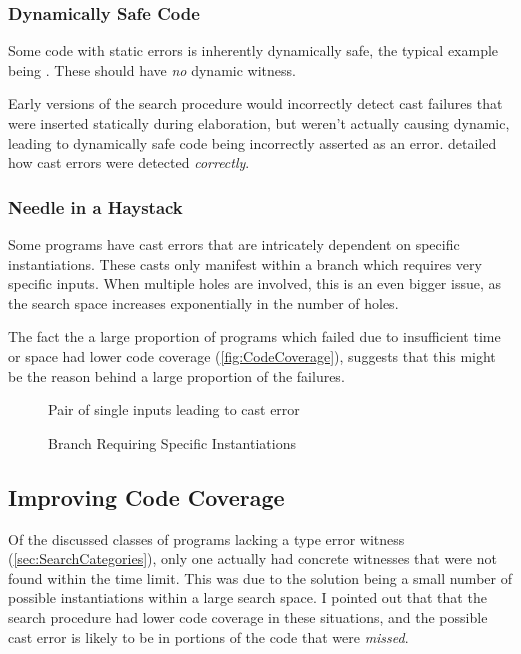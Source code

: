 \subsubsection{Dynamically Safe Code}
Some code with static errors is inherently dynamically safe, the typical example being . These should have \textit{no} dynamic witness. 

Early versions of the search procedure would incorrectly detect cast failures that were inserted statically during elaboration, but weren't actually causing dynamic, leading to dynamically safe code being incorrectly asserted as an error.  detailed how cast errors were detected \textit{correctly}.

\subsubsection{Needle in a Haystack}
Some programs have cast errors that are intricately dependent on specific instantiations. These casts only manifest within a branch which requires very specific inputs. When multiple holes are involved, this is an even bigger issue, as the search space increases exponentially in the number of holes.

The fact the a large proportion of programs which failed due to insufficient time or space had lower code coverage (\cref{fig:CodeCoverage}), suggests that this might be the reason behind a large proportion of the failures.

\begin{figure}\centering
Pair of single inputs leading to cast error
\caption{Branch Requiring Specific Instantiations}
\label{fig:SpecificInstantiations}
\end{figure}


\subsection{Improving Code Coverage}
\label{sec:EvalHoleInstantiation}
Of the discussed classes of programs lacking a type error witness (\cref{sec:SearchCategories}), only one actually had concrete witnesses that were not found within the time limit. This was due to the solution being a small number of possible instantiations within a large search space. I pointed out that that the search procedure had lower code coverage in these situations, and the possible cast error is likely to be in portions of the code that were \textit{missed}.

